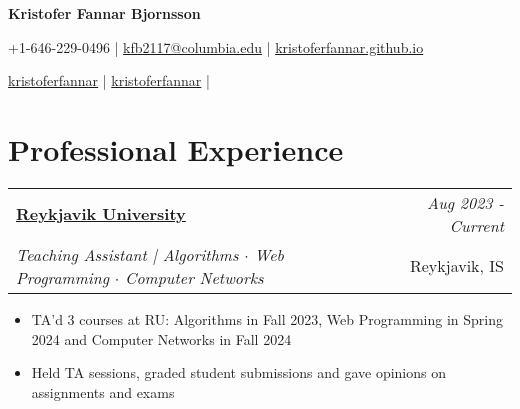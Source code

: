 \documentclass{article}
\makeatletter
\newcommand{\resumeSubheading}[4]{
\vspace{0.5mm}
    \begin{tabular*}{0.98\textwidth}[t]{l@{\extracolsep{\fill}}r}
		\textbf{\normalsize{#1}} & \textit{\footnotesize{#4}} \\
        \textit{\footnotesize{#3}} &  \footnotesize{#2}\\
    \end{tabular*}
    \vspace{-2.4mm}
}
\newcommand{\resumeSubHeadingListStart}{}
\newcommand{\resumeItemListStart}{\begin{itemize}[leftmargin=*,labelsep=1mm,itemsep=0.5mm]\normalsize}
\newcommand{\resumeItemListEnd}{\end{itemize}\vspace{-2mm}}
\newcommand{\socialicon}[1]{\raisebox{-0.05em}{\resizebox{!}{1em}{#1}}}
\newcommand{\headerfontiii}{\fontfamily{ppl}\selectfont} %
\makeatother
\begin{document}
\headerfontiii

\begin{center}
    {\Huge\textbf{Kristofer Fannar Bjornsson}}
\end{center}
\vspace{-6mm}

\begin{center}
    \small{
    +1-646-229-0496 | \href{mailto:kfb2117@columbia.edu}{kfb2117@columbia.edu} | 
    \href{https://kristoferfannar.github.io}{kristoferfannar.github.io}
    }
\end{center}
\vspace{-6mm}

\begin{center}
    \small{
    \socialicon{\faLinkedin} \href{https://www.linkedin.com/in/kristoferfannar/}{kristoferfannar} | 
    \socialicon{\faGithub} \href{https://github.com/kristoferfannar}{kristoferfannar} | 
    }
\end{center}
\vspace{-6mm}
%
%



\section{\textbf{Professional Experience}}
\vspace{-0.4mm}
  \resumeSubHeadingListStart

  \resumeSubheading
  {\href{https://www.ru.is}{Reykjavik University}}{Reykjavik, IS}
    {Teaching Assistant | Algorithms $\cdot$ Web Programming $\cdot$ Computer Networks}{Aug 2023 - Current}
    \resumeItemListStart
      \item TA'd 3 courses at RU: Algorithms in Fall 2023, Web Programming in Spring 2024 and Computer Networks in Fall 2024
	  \item Held TA sessions, graded student submissions and gave opinions on assignments and exams
    \resumeItemListEnd
\end{document}
